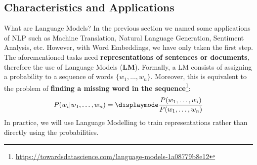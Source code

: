 \documentclass[UKenglish]{beamer}
\begin{document}
\subsection{Characteristics and Applications}
\begin{frame}{What are Language Models?}
    In the previous section we named some applications of NLP such as Machine Translation, Natural Language Generation, Sentiment Analysis, etc. However, with Word Embeddings, we have only taken the first step. \vspace{0.2cm}\\
    The aforementioned tasks need \textbf{representations of sentences or documents}, therefore the use of Language Models (\textbf{LM}). Formally, a LM consists of assigning a probability to a sequence of words $\{w_1,\dots,w_n\}$. Moreover, this is equivalent to the problem of \textbf{finding a missing word in the sequence}\footnote{\url{https://towardsdatascience.com/language-models-1a08779b8e12}}:
    $$ P(w_i|w_1,\dots,w_n) = \displaymode \frac{P(w_1,\dots,w_i)}{P(w_1,\dots,w_n)} $$
    In practice, we will use Language Modelling to train representations rather than directly using the probabilities.
\end{frame}
\end{document}
